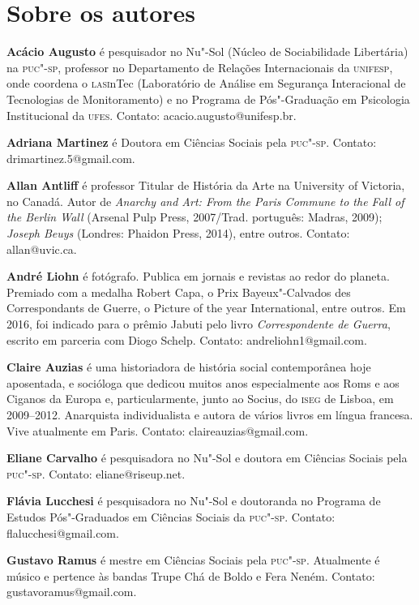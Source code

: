 \chapter{Sobre os autores}

\bigskip
\noindent\textbf{Acácio Augusto} é pesquisador no Nu"-Sol (Núcleo de Sociabilidade
Libertária) na \textsc{puc"-sp}, professor no Departamento de Relações
Internacionais da \textsc{unifesp}, onde coordena o \textsc{lasi}nTec (Laboratório de
Análise em Segurança Interacional de Tecnologias de Monitoramento) e no
Programa de Pós"-Graduação em Psicologia Institucional da \textsc{ufes}. Contato:
acacio.augusto@unifesp.br.

\bigskip
\noindent\textbf{Adriana Martinez} é Doutora em Ciências Sociais pela \textsc{puc"-sp.}
Contato: drimartinez.5@gmail.com.

\bigskip
\noindent\textbf{Allan Antliff} é professor Titular de História da Arte na
University of Victoria, no Canadá. Autor de \emph{Anarchy and Art: From
the Paris Commune to the Fall of the Berlin Wall} (Arsenal Pulp Press,
2007/Trad. português: Madras, 2009); \emph{Joseph Beuys} (Londres:
Phaidon Press, 2014), entre outros. Contato:
allan@uvic.ca.

\bigskip
\noindent\textbf{André Liohn} é fotógrafo. Publica em jornais e revistas ao redor
do planeta. Premiado com a medalha Robert Capa, o Prix Bayeux"-Calvados
des Correspondants de Guerre, o Picture of the year International, entre
outros. Em 2016, foi indicado para o prêmio Jabuti pelo livro
\emph{Correspondente de Guerra}, escrito em parceria com Diogo Schelp.
Contato: andreliohn1@gmail.com.

\bigskip
\noindent\textbf{Claire Auzias} é uma historiadora de história social
contemporânea hoje aposentada, e socióloga que dedicou muitos anos
especialmente aos Roms e aos Ciganos da Europa e, particularmente, junto
ao Socius, do \textsc{iseg} de Lisboa, em 2009--2012. Anarquista individualista e
autora de vários livros em língua francesa. Vive atualmente em Paris.
Contato: claireauzias@gmail.com.


\bigskip
\noindent\textbf{Eliane Carvalho} é pesquisadora no Nu"-Sol e doutora em Ciências
Sociais pela \textsc{puc"-sp}. Contato: eliane@riseup.net.

\bigskip
\noindent\textbf{Flávia Lucchesi} é pesquisadora no Nu"-Sol e doutoranda no
Programa de Estudos Pós"-Graduados em Ciências Sociais da \textsc{puc"-sp.}
Contato: flalucchesi@gmail.com.

\bigskip
\noindent\textbf{Gustavo Ramus} é mestre em Ciências Sociais pela \textsc{puc"-sp.}
Atualmente é músico e pertence às bandas Trupe Chá de Boldo e Fera
Neném. Contato: gustavoramus@gmail.com.

